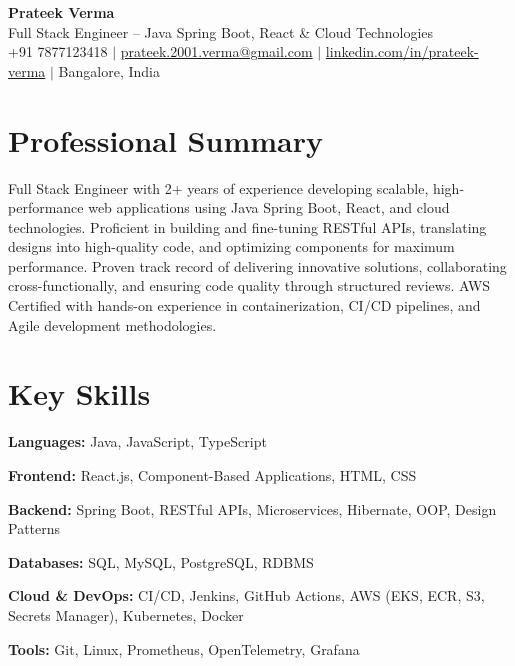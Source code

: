 \documentclass[letterpaper,10.5pt]{article}
\begin{document}
\begin{center}
  {\LARGE \textbf{Prateek Verma}} \\[4pt]
  \small Full Stack Engineer -- Java Spring Boot, React \& Cloud Technologies \\[4pt]
  +91 7877123418 \;$|$\;
  \href{mailto:prateek.2001.verma@gmail.com}{prateek.2001.verma@gmail.com} \;$|$\;
  \href{https://linkedin.com/in/prateek-verma-8125b3201}{linkedin.com/in/prateek-verma} \;$|$\;
  Bangalore, India
\end{center}

\section{Professional Summary}
\small{
Full Stack Engineer with 2+ years of experience developing scalable, high-performance web applications using Java Spring Boot, React, and cloud technologies. Proficient in building and fine-tuning RESTful APIs, translating designs into high-quality code, and optimizing components for maximum performance. Proven track record of delivering innovative solutions, collaborating cross-functionally, and ensuring code quality through structured reviews. AWS Certified with hands-on experience in containerization, CI/CD pipelines, and Agile development methodologies.
}

\section{Key Skills}
\begin{itemize}[leftmargin=0.15in, label={}, itemsep=-1pt]
  \small{
    \item \textbf{Languages:} Java, JavaScript, TypeScript
    \item \textbf{Frontend:} React.js, Component-Based Applications, HTML, CSS
    \item \textbf{Backend:} Spring Boot, RESTful APIs, Microservices, Hibernate, OOP, Design Patterns
    \item \textbf{Databases:} SQL, MySQL, PostgreSQL, RDBMS
    \item \textbf{Cloud \& DevOps:} CI/CD, Jenkins, GitHub Actions, AWS (EKS, ECR, S3, Secrets Manager), Kubernetes, Docker
    \item \textbf{Tools:} Git, Linux, Prometheus, OpenTelemetry, Grafana
  }
\end{itemize}
\end{document}
